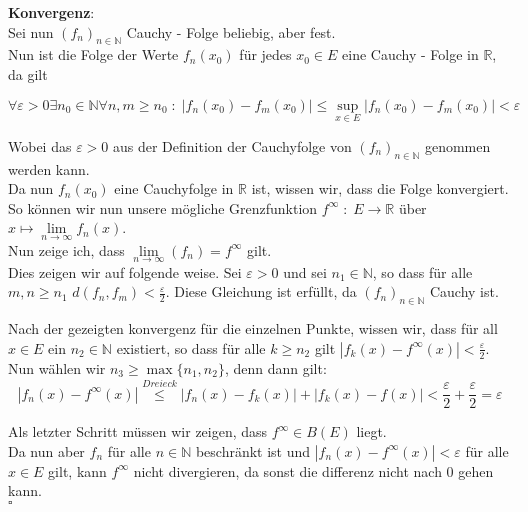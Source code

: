 \textbf{Konvergenz}:\\
Sei nun $(f_n)_{n \in \mathbb{N}}$ Cauchy - Folge beliebig, aber fest.\\

Nun ist die Folge der Werte $f_n(x_0)$ für jedes $x_0 \in E$ eine Cauchy - Folge in $\mathbb{R}$, da gilt

$\forall \varepsilon > 0 \exists n_0 \in \mathbb{N} \forall n,m \geq n_0 \; : \; |f_n(x_0) - f_m(x_0)| \leq \underset{x \in E}{\sup} |f_n(x_0) -f_m (x_0) | < \varepsilon$

Wobei das $\varepsilon > 0$ aus der Definition der Cauchyfolge von $(f_n)_{n \in \mathbb{N}}$ genommen werden kann.\\

Da nun $f_n(x_0)$ eine Cauchyfolge in $\mathbb{R}$ ist, wissen wir, dass die Folge konvergiert. So können wir nun unsere mögliche
Grenzfunktion $f^\infty \; : \; E \rightarrow \mathbb{R}$ über \\
$x \mapsto \underset{n \rightarrow \infty}{\lim} f_n(x)$.\\

Nun zeige ich, dass $\underset{n \rightarrow \infty}{\lim} (f_n) = f^\infty$ gilt.\\

Dies zeigen wir auf folgende weise. Sei $\varepsilon > 0$ und sei $n_1 \in \mathbb{N}$, so dass für alle $m,n \geq n_1$
$d(f_n, f_m) < \frac{\varepsilon}{2}$. Diese Gleichung ist erfüllt, da $(f_n)_{n \in \mathbb{N}}$ Cauchy ist.

Nach der gezeigten konvergenz für die einzelnen Punkte, wissen wir, dass für all $x \in E$ ein $n_2 \in \mathbb{N}$ existiert,
so dass für alle $k \geq n_2 $ gilt $| f_k(x) - f^\infty (x) | < \frac{\varepsilon}{2}$.\\

Nun wählen wir $n_3 \geq \max \{ n_1 , n_2 \}$, denn dann gilt:
$$
    |f_n(x) - f^\infty (x)| \stackrel{Dreieck}{\leq} | f_n (x) - f_k (x)| + | f_k (x) - f(x) | < \frac{\varepsilon}{2} + \frac{\varepsilon}{2} = \varepsilon
$$

Als letzter Schritt müssen wir zeigen, dass $f^\infty \in B(E)$ liegt.\\
Da nun aber $f_n$ für alle $n \in \mathbb{N}$ beschränkt ist und $|f_n(x) - f^\infty (x)| < \varepsilon$ für alle $x \in E$ gilt, kann $f^\infty$ nicht divergieren,
da sonst die differenz nicht nach 0 gehen kann.\\

\mbox{} \hfill $\square$

\pagebreak
